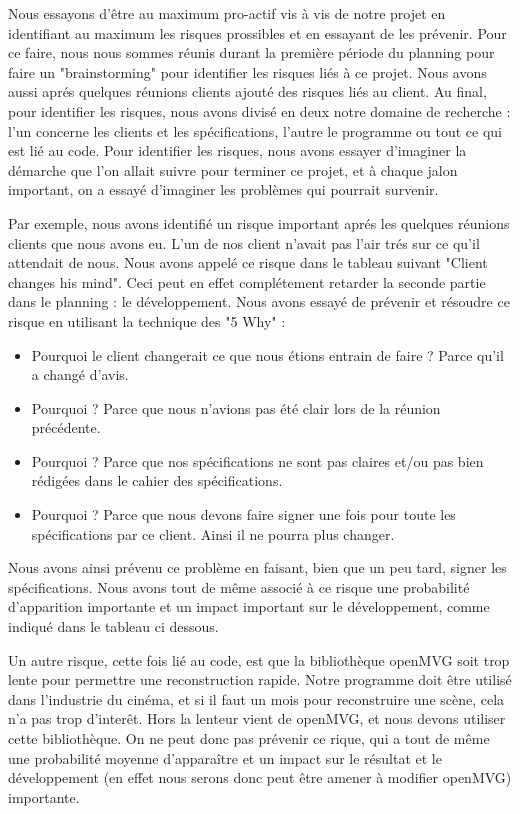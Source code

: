 Nous essayons d'être au maximum pro-actif vis à vis de notre projet en identifiant au maximum les risques prossibles
et en essayant de les prévenir. Pour ce faire, nous nous sommes réunis durant la première période du planning pour faire
un "brainstorming" pour identifier les risques liés à ce projet. Nous avons aussi aprés quelques réunions clients ajouté des risques
liés au client. Au final, pour identifier les risques, nous avons divisé en deux notre domaine de recherche : l'un concerne 
les clients et les spécifications, l'autre le programme ou tout ce qui est lié au code.	Pour identifier les risques, nous avons essayer d'imaginer la
démarche que l'on allait suivre pour terminer ce projet, et à chaque jalon important, on a essayé d'imaginer les problèmes qui pourrait survenir. 


	Par exemple, nous avons identifié un risque important aprés les quelques réunions clients que nous avons eu. L'un de nos 
client n'avait pas l'air trés sur ce qu'il attendait de nous. Nous avons appelé ce risque dans le tableau suivant "Client changes his mind". 
Ceci peut en effet complétement retarder la seconde partie dans le planning : le développement. Nous avons essayé de prévenir et résoudre 
ce risque en utilisant la technique des "5 Why" :\\
\begin{itemize}
\item Pourquoi le client changerait ce que nous étions entrain de faire ? Parce qu'il a changé d'avis.\\
\item  Pourquoi ? Parce que nous n'avions pas été clair lors de la réunion précédente.\\
\item Pourquoi ? Parce que nos spécifications ne sont pas claires et/ou pas bien rédigées dans le cahier des spécifications.\\
\item Pourquoi ? Parce que nous devons faire signer une fois pour toute les spécifications par ce client. Ainsi il ne pourra plus changer.\\
\end{itemize}

Nous avons ainsi prévenu ce problème en faisant, bien que un peu tard, signer les spécifications. Nous avons tout de même associé à ce risque
une probabilité d'apparition importante et un impact important sur le développement, comme indiqué dans le tableau ci dessous. 


	Un autre risque, cette fois lié au code, est que la bibliothèque openMVG soit trop lente pour permettre une reconstruction rapide. Notre
programme doit être utilisé dans l'industrie du cinéma, et si il faut un mois pour reconstruire une scène, cela n'a pas trop d'interêt. Hors la lenteur
vient de openMVG, et nous devons utiliser cette bibliothèque. On ne peut donc pas prévenir ce rique, qui a tout de même une probabilité moyenne
d'apparaître et un impact sur le résultat et le développement (en effet nous serons donc peut être amener à modifier openMVG) importante.


